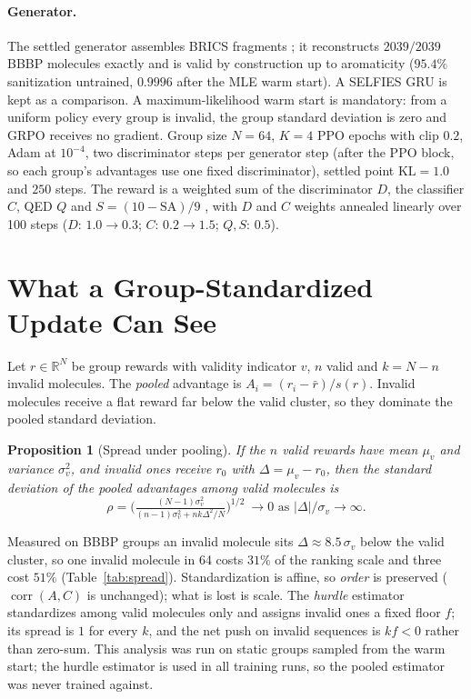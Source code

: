 \documentclass[10pt,letterpaper]{article}
\newtheorem{proposition}{Proposition}
\newcommand{\R}{\mathbb{R}}
\begin{document}
\paragraph{Generator.} The settled generator assembles BRICS fragments \cite{degen2008}; it reconstructs $2039/2039$ BBBP molecules exactly and is valid by construction up to aromaticity ($95.4\%$ sanitization untrained, $0.9996$ after the MLE warm start). A SELFIES GRU \cite{krenn2020} is kept as a comparison. A maximum-likelihood warm start is mandatory: from a uniform policy every group is invalid, the group standard deviation is zero and GRPO receives no gradient. Group size $N=64$, $K=4$ PPO epochs with clip $0.2$, Adam at $10^{-4}$, two discriminator steps per generator step (after the PPO block, so each group's advantages use one fixed discriminator), settled point $\mathrm{KL}=1.0$ and $250$ steps. The reward is a weighted sum of the discriminator $D$, the classifier $C$, QED $Q$ \cite{bickerton2012} and $S=(10-\mathrm{SA})/9$ \cite{ertl2009}, with $D$ and $C$ weights annealed linearly over 100 steps ($D$: $1.0\to0.3$; $C$: $0.2\to1.5$; $Q,S$: $0.5$).

\section{What a Group-Standardized Update Can See}\label{sec:theory}
Let $r\in\R^N$ be group rewards with validity indicator $v$, $n$ valid and $k=N-n$ invalid molecules. The \emph{pooled} advantage is $A_i=(r_i-\bar r)/s(r)$. Invalid molecules receive a flat reward far below the valid cluster, so they dominate the pooled standard deviation.

\begin{proposition}[Spread under pooling]\label{prop:spread}
If the $n$ valid rewards have mean $\mu_v$ and variance $\sigma_v^2$, and invalid ones receive $r_0$ with $\Delta=\mu_v-r_0$, then the standard deviation of the pooled advantages among valid molecules is
\[
\rho=\Big(\tfrac{(N-1)\sigma_v^2}{(n-1)\sigma_v^2+nk\Delta^2/N}\Big)^{1/2}\ \to 0 \text{ as } |\Delta|/\sigma_v\to\infty .
\]
\end{proposition}
Measured on BBBP groups an invalid molecule sits $\Delta\approx8.5\,\sigma_v$ below the valid cluster, so one invalid molecule in 64 costs $31\%$ of the ranking scale and three cost $51\%$ (Table~\ref{tab:spread}). Standardization is affine, so \emph{order} is preserved ($\operatorname{corr}(A,C)$ is unchanged); what is lost is scale. The \emph{hurdle} estimator standardizes among valid molecules only and assigns invalid ones a fixed floor $f$; its spread is $1$ for every $k$, and the net push on invalid sequences is $kf<0$ rather than zero-sum. This analysis was run on static groups sampled from the warm start; the hurdle estimator is used in all training runs, so the pooled estimator was never trained against.
\end{document}
